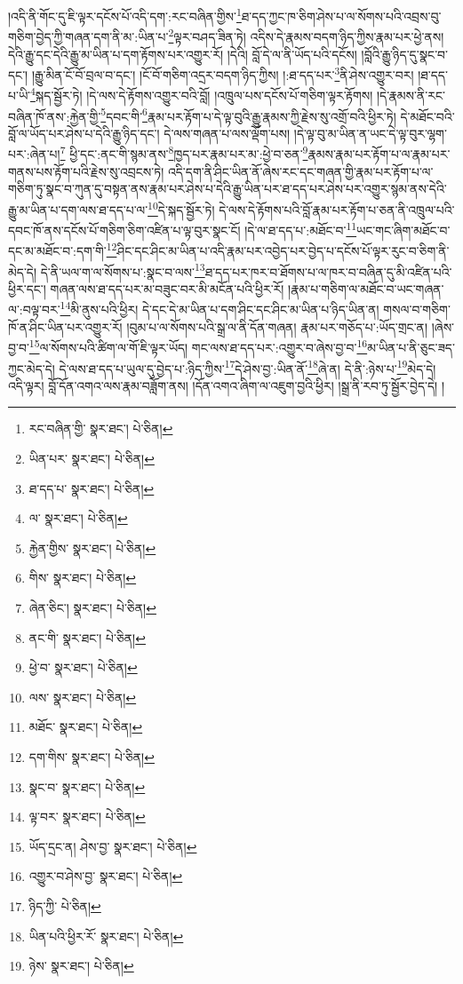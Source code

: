 །འདི་ནི་གོང་དུ་ཇི་ལྟར་དངོས་པོ་འདི་དག་:རང་བཞིན་གྱིས་\footnote{རང་བཞིན་གྱི་  སྣར་ཐང་།  པེ་ཅིན། }ཐ་དད་ཀྱང་ཁ་ཅིག་ཤེས་པ་ལ་སོགས་པའི་འབྲས་བུ་གཅིག་བྱེད་ཀྱི་གཞན་དག་ནི་མ་:ཡིན་པ་\footnote{ཡིན་པར་  སྣར་ཐང་།  པེ་ཅིན། }ལྟར་བཤད་ཟིན་ཏེ། འདིས་དེ་རྣམས་བདག་ཉིད་ཀྱིས་རྣམ་པར་ཕྱེ་ནས། དེའི་རྒྱུ་དང་དེའི་རྒྱུ་མ་ཡིན་པ་དག་རྟོགས་པར་འགྱུར་རོ། །དེའི། བློ་དེ་ལ་ནི་ཡོད་པའི་དངོས། །བློའི་རྒྱུ་ཉིད་དུ་སྣང་བ་དང་། །རྒྱུ་མིན་ངོ་བོ་བྲལ་བ་དང་། །ངོ་བོ་གཅིག་འདྲར་བདག་ཉིད་ཀྱིས། །:ཐ་དད་པར་\footnote{ཐ་དད་པ་  སྣར་ཐང་།  པེ་ཅིན། }ནི་ཤེས་འགྱུར་བར། །ཐ་དད་པ་ཡི་\footnote{ལ་  སྣར་ཐང་།  པེ་ཅིན། }སྐད་སྦྱོར་ཏེ། །དེ་ལས་དེ་རྟོགས་འགྱུར་བའི་བློ། །འཁྲུལ་པས་དངོས་པོ་གཅིག་ལྟར་རྟོགས། །དེ་རྣམས་ནི་རང་བཞིན་ཁོ་ནས་:རྐྱེན་གྱི་\footnote{རྐྱེན་གྱིས་  སྣར་ཐང་།  པེ་ཅིན། }དབང་གི་\footnote{གིས་  སྣར་ཐང་།  པེ་ཅིན། }རྣམ་པར་རྟོག་པ་དེ་ལྟ་བུའི་རྒྱུ་རྣམས་ཀྱི་རྗེས་སུ་འགྲོ་བའི་ཕྱིར་ཏེ། དེ་མཐོང་བའི་བློ་ལ་ཡོད་པར་ཤེས་པ་དེའི་རྒྱུ་ཉིད་དང་། དེ་ལས་གཞན་པ་ལས་ལྡོག་པས། །དེ་ལྟ་བུ་མ་ཡིན་ན་ཡང་དེ་ལྟ་བུར་ལྷག་པར་:ཞེན་པ།\footnote{ཞེན་ཅིང་།  སྣར་ཐང་།  པེ་ཅིན། } ཕྱི་དང་:ནང་གི་སྙམ་ནས་\footnote{ནང་གི་  སྣར་ཐང་།  པེ་ཅིན། }ཁྱད་པར་རྣམ་པར་མ་:ཕྱེ་བ་ཅན་\footnote{ཕྱེ་བ་  སྣར་ཐང་།  པེ་ཅིན། }རྣམས་རྣམ་པར་རྟོག་པ་ལ་རྣམ་པར་གནས་པས་རྟོག་པའི་རྗེས་སུ་འབྲངས་ཏེ། འདི་དག་ནི་ཤིང་ཡིན་ནོ་ཞེས་རང་དང་གཞན་གྱི་རྣམ་པར་རྟོག་པ་ལ་གཅིག་ཏུ་སྣང་བ་ཀུན་དུ་བསྟན་ནས་རྣམ་པར་ཤེས་པ་དེའི་རྒྱུ་ཡིན་པར་ཐ་དད་པར་ཤེས་པར་འགྱུར་སྙམ་ནས་དེའི་རྒྱུ་མ་ཡིན་པ་དག་ལས་ཐ་དད་པ་ལ་\footnote{ལས་  སྣར་ཐང་།  པེ་ཅིན། }དེ་སྐད་སྦྱོར་ཏེ། དེ་ལས་དེ་རྟོགས་པའི་བློ་རྣམ་པར་རྟོག་པ་ཅན་ནི་འཁྲུལ་པའི་དབང་ཁོ་ནས་དངོས་པོ་གཅིག་ཅིག་འཛིན་པ་ལྟ་བུར་སྣང་ངོ། །དེ་ལ་ཐ་དད་པ་:མཐོང་བ་\footnote{མཐོང་  སྣར་ཐང་།  པེ་ཅིན། }ཡང་གང་ཞིག་མཐོང་བ་དང་མ་མཐོང་བ་:དག་གི་\footnote{དག་གིས་  སྣར་ཐང་།  པེ་ཅིན། }ཤིང་དང་ཤིང་མ་ཡིན་པ་འདི་རྣམ་པར་འབྱེད་པར་བྱེད་པ་དངོས་པོ་ལྟར་རུང་བ་ཅིག་ནི་མེད་དེ། དེ་ནི་ཡལ་ག་ལ་སོགས་པ་:སྣང་བ་ལས་\footnote{སྣང་བ་  སྣར་ཐང་།  པེ་ཅིན། }ཐ་དད་པར་ཁར་བ་ཐོགས་པ་ལ་ཁར་བ་བཞིན་དུ་མི་འཛིན་པའི་ཕྱིར་དང་། གཞན་ལས་ཐ་དད་པར་མ་བཟུང་བར་མི་མངོན་པའི་ཕྱིར་རོ། །རྣམ་པ་གཅིག་ལ་མཐོང་བ་ཡང་གཞན་ལ་:བལྟ་བར་\footnote{ལྟ་བར་  སྣར་ཐང་།  པེ་ཅིན། }མི་ནུས་པའི་ཕྱིར། དེ་དང་དེ་མ་ཡིན་པ་དག་ཤིང་དང་ཤིང་མ་ཡིན་པ་ཉིད་ཡིན་ན། གསལ་བ་གཅིག་ཁོ་ན་ཤིང་ཡིན་པར་འགྱུར་རོ། །བུམ་པ་ལ་སོགས་པའི་སྒྲ་ལ་ནི་དོན་གཞན། རྣམ་པར་གཅོད་པ་:ཡོད་གྲང་ན། །ཞེས་བྱ་བ་\footnote{ཡོད་དྲང་ན། ཤེས་བྱ་  སྣར་ཐང་།  པེ་ཅིན། }ལ་སོགས་པའི་ཚིག་ལ་གོ་ཇི་ལྟར་ཡོད། གང་ལས་ཐ་དད་པར་:འགྱུར་བ་ཞེས་བྱ་བ་\footnote{འགྱུར་བ་ཤེས་བྱ་  སྣར་ཐང་།  པེ་ཅིན། }མ་ཡིན་པ་ནི་ཅུང་ཟད་ཀྱང་མེད་དེ། དེ་ལས་ཐ་དད་པ་ཡུལ་དུ་བྱེད་པ་:ཉིད་ཀྱིས་\footnote{ཉིད་ཀྱི་  པེ་ཅིན། }དེ་ཤེས་བྱ་:ཡིན་ནོ་\footnote{ཡིན་པའི་ཕྱིར་རོ་  སྣར་ཐང་།  པེ་ཅིན། }ཞེ་ན། དེ་ནི་:ཉེས་པ་\footnote{ཉེས་  སྣར་ཐང་།  པེ་ཅིན། }མེད་དེ། འདི་ལྟར། བློ་དོན་འགའ་ལས་རྣམ་བཟློག་ནས། །དོན་འགའ་ཞིག་ལ་འཇུག་བྱའི་ཕྱིར། །སྒྲ་ནི་རབ་ཏུ་སྦྱོར་བྱེད་དེ། །

